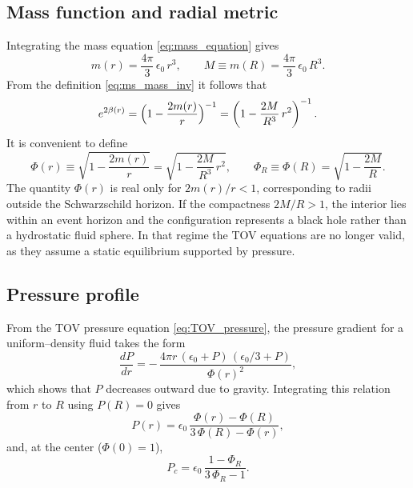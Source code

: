 \subsection*{Mass function and radial metric}
Integrating the mass equation \eqref{eq:mass_equation} gives
\begin{equation}
m(r)=\frac{4\pi}{3}\,\epsilon_{0}\,r^{3},\qquad
M\equiv m(R)=\frac{4\pi}{3}\,\epsilon_{0}\,R^{3}.
\label{eq:const_density_mass}
\end{equation}
From the definition \eqref{eq:ms_mass_inv} it follows that
\begin{equation}
e^{2\beta(r)}=\Bigl(1-\frac{2m(r)}{r}\Bigr)^{-1}
=\left(1-\frac{2M}{R^{3}}\,r^{2}\right)^{-1}.
\label{eq:beta_uniform}
\end{equation}
It is convenient to define
\begin{equation}
\Phi(r)\equiv \sqrt{1-\frac{2m(r)}{r}}=\sqrt{1-\frac{2M}{R^{3}}\,r^{2}},
\qquad
\Phi_{R}\equiv \Phi(R)=\sqrt{1-\frac{2M}{R}}.
\label{eq:Phi_defs}
\end{equation}
The quantity $\Phi(r)$ is real only for $2m(r)/r<1$, corresponding to radii outside the Schwarzschild horizon.
If the compactness $2M/R>1$, the interior lies within an event horizon and the configuration represents a black hole rather than a hydrostatic fluid sphere.
In that regime the TOV equations are no longer valid, as they assume a static equilibrium supported by pressure.

\subsection*{Pressure profile}
From the TOV pressure equation \eqref{eq:TOV_pressure}, the pressure
gradient for a uniform--density fluid takes the form
\[
\frac{dP}{dr}
=-\,\frac{4\pi r\,(\epsilon_{0}+P)\,(\epsilon_{0}/3+P)}{\Phi(r)^{2}},
\]
which shows that $P$ decreases outward due to gravity.  Integrating this
relation from $r$ to $R$ using $P(R)=0$ gives
\begin{equation}
P(r)
=\epsilon_{0}\,
\frac{\Phi(r)-\Phi(R)}{3\,\Phi(R)-\Phi(r)},
\label{eq:const_density_pressure}
\end{equation}
and, at the center ($\Phi(0)=1$),
\begin{equation}
P_{c}
=\epsilon_{0}\,
\frac{1-\Phi_{R}}{3\,\Phi_{R}-1}.
\label{eq:Pc_const_density}
\end{equation}

